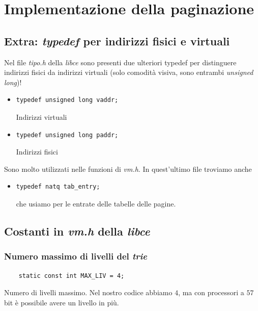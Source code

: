 

\chapter{Implementazione della paginazione}

\section{Extra: \emph{typedef} per indirizzi fisici e virtuali} Nel file \emph{tipo.h} della \emph{libce} sono presenti due ulteriori typedef per distinguere indirizzi fisici da indirizzi virtuali (solo comodità visiva, sono entrambi \emph{unsigned long})!
\begin{itemize}
	\item \begin{verbatim}typedef unsigned long vaddr;\end{verbatim}
	Indirizzi virtuali
	\item \begin{verbatim}typedef unsigned long paddr;\end{verbatim}
	Indirizzi fisici
\end{itemize}
Sono molto utilizzati nelle funzioni di \emph{vm.h}. In quest'ultimo file troviamo anche 
\begin{itemize}
	\item \begin{verbatim}typedef natq tab_entry;
	\end{verbatim}
	che usiamo per le entrate delle tabelle delle pagine.
\end{itemize} 
\section{Costanti in \emph{vm.h} della \emph{libce}}
\subsection{Numero massimo di livelli del \emph{trie}} \begin{verbatim}
	static const int MAX_LIV = 4;
\end{verbatim}
Numero di livelli massimo. Nel nostro codice abbiamo $4$, ma con processori a $57$ bit è possibile avere un livello in più. 
